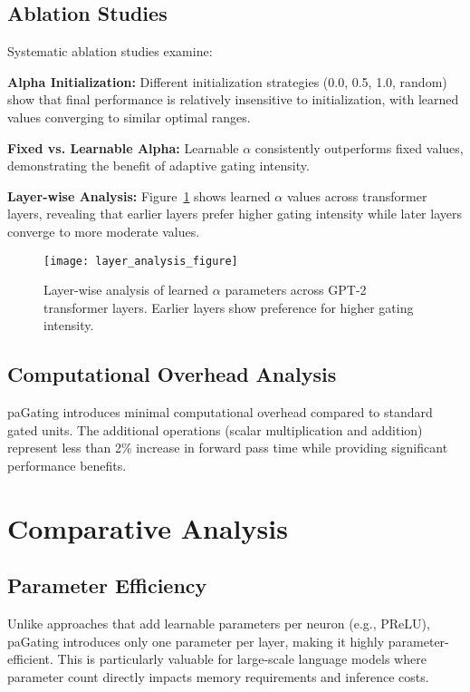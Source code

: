 \documentclass[lettersize,journal]{IEEEtran}
\begin{document}
\subsection{Ablation Studies}
Systematic ablation studies examine:

\textbf{Alpha Initialization:} Different initialization strategies (0.0, 0.5, 1.0, random) show that final performance is relatively insensitive to initialization, with learned values converging to similar optimal ranges.

\textbf{Fixed vs. Learnable Alpha:} Learnable $\alpha$ consistently outperforms fixed values, demonstrating the benefit of adaptive gating intensity.

\textbf{Layer-wise Analysis:} Figure~\ref{fig:layer_analysis} shows learned $\alpha$ values across transformer layers, revealing that earlier layers prefer higher gating intensity while later layers converge to more moderate values.

\begin{figure}[!t]
\centering
\texttt{[image: layer\_analysis\_figure]}
\caption{Layer-wise analysis of learned $\alpha$ parameters across GPT-2 transformer layers. Earlier layers show preference for higher gating intensity.}
\label{fig:layer_analysis}
\end{figure}

\subsection{Computational Overhead Analysis}
paGating introduces minimal computational overhead compared to standard gated units. The additional operations (scalar multiplication and addition) represent less than 2\% increase in forward pass time while providing significant performance benefits.

\section{Comparative Analysis}

\subsection{Parameter Efficiency}
Unlike approaches that add learnable parameters per neuron (e.g., PReLU), paGating introduces only one parameter per layer, making it highly parameter-efficient. This is particularly valuable for large-scale language models where parameter count directly impacts memory requirements and inference costs.
\end{document}
